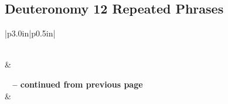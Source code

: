 \subsection{Deuteronomy 12 Repeated Phrases}


\normalsize
 
\begin{center}
\begin{longtable}{|p{3.0in}|p{0.5in}|}
\caption[Deuteronomy 12 Repeated Phrases]{Deuteronomy 12 Repeated Phrases}\label{table:Repeated Phrases Deuteronomy 12} \\
\hline {} &  \\ \hline 
\endfirsthead
 
{{\bfseries \tablename\ \thetable{} -- continued from previous page}} \\  
\hline {} &  \\ \hline 
\endhead
 

\end{longtable}
\end{center}
